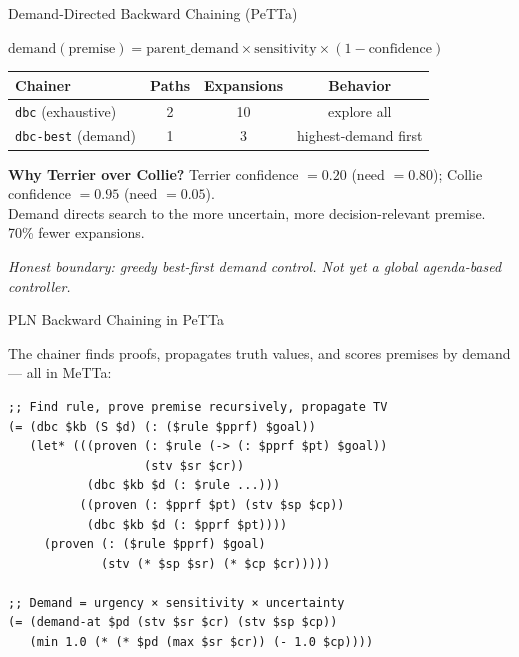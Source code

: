 \documentclass[aspectratio=169,11pt]{beamer}
\begin{document}
\begin{frame}{Demand-Directed Backward Chaining (PeTTa)}

$\text{demand}(\text{premise})
= \text{parent\_demand} \times \text{sensitivity}
\times (1 - \text{confidence})$

\medskip
\begin{center}
\footnotesize
\begin{tabular}{lccc}
\toprule
\textbf{Chainer} & \textbf{Paths} & \textbf{Expansions}
  & \textbf{Behavior} \\
\midrule
\texttt{dbc} (exhaustive) & 2 & 10 & explore all \\
\texttt{dbc-best} (demand) & 1 & 3 & highest-demand first \\
\bottomrule
\end{tabular}
\end{center}

\medskip
\textbf{Why Terrier over Collie?}
Terrier confidence $= 0.20$ (need $= 0.80$);
Collie confidence $= 0.95$ (need $= 0.05$).\\
Demand directs search to the more uncertain, more
decision-relevant premise.  \alert{70\% fewer expansions.}

\medskip
{\small\textit{Honest boundary: greedy best-first demand control.
Not yet a global agenda-based controller.}}

\end{frame}

\begin{frame}[fragile]{PLN Backward Chaining in PeTTa}

The chainer finds proofs, propagates truth values, and
scores premises by demand --- all in MeTTa:

\medskip
{\footnotesize
\begin{verbatim}
;; Find rule, prove premise recursively, propagate TV
(= (dbc $kb (S $d) (: ($rule $pprf) $goal))
   (let* (((proven (: $rule (-> (: $pprf $pt) $goal))
                   (stv $sr $cr))
           (dbc $kb $d (: $rule ...)))
          ((proven (: $pprf $pt) (stv $sp $cp))
           (dbc $kb $d (: $pprf $pt))))
     (proven (: ($rule $pprf) $goal)
             (stv (* $sp $sr) (* $cp $cr)))))

;; Demand = urgency × sensitivity × uncertainty
(= (demand-at $pd (stv $sr $cr) (stv $sp $cp))
   (min 1.0 (* (* $pd (max $sr $cr)) (- 1.0 $cp))))
\end{verbatim}}

\end{frame}
\end{document}
